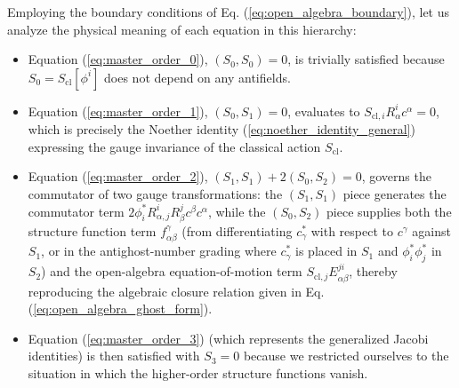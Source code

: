 Employing the boundary conditions of Eq. (\ref{eq:open_algebra_boundary}), let us analyze the physical meaning of each equation in this hierarchy:
\begin{itemize}
    \item Equation (\ref{eq:master_order_0}), \((S_0, S_0) = 0\), is trivially satisfied because \(S_0 = S_{\text{cl}}[\phi^i]\) does not depend on any antifields.
    \item Equation (\ref{eq:master_order_1}), \((S_0, S_1) = 0\), evaluates to \(S_{\text{cl}, i} R^i_\alpha c^\alpha = 0\), which is precisely the Noether identity (\ref{eq:noether_identity_general}) expressing the gauge invariance of the classical action \(S_{\text{cl}}\).
    \item Equation (\ref{eq:master_order_2}), \((S_1, S_1) + 2(S_0, S_2) = 0\), governs the commutator of two gauge transformations: the \((S_1, S_1)\) piece generates the commutator term \(2 \phi_i^* R^i_{\alpha, j} R^j_\beta c^\beta c^\alpha\), while the \((S_0, S_2)\) piece supplies both the structure function term \(f^\gamma_{\alpha\beta}\) (from differentiating \(c_\gamma^*\) with respect to \(c^\gamma\) against \(S_1\), or in the antighost-number grading where \(c_\gamma^*\) is placed in \(S_1\) and \(\phi_i^* \phi_j^*\) in \(S_2\)) and the open-algebra equation-of-motion term \(S_{\text{cl}, j} E^{ji}_{\alpha\beta}\), thereby reproducing the algebraic closure relation given in Eq. (\ref{eq:open_algebra_ghost_form}).
    \item Equation (\ref{eq:master_order_3}) (which represents the generalized Jacobi identities) is then satisfied with \(S_3 = 0\) because we restricted ourselves to the situation in which the higher-order structure functions vanish.
\end{itemize}

